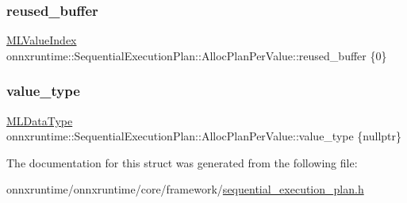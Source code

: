 \subsubsection{\texorpdfstring{reused\+\_\+buffer}{reused\_buffer}}
{\footnotesize\ttfamily \mbox{\hyperlink{namespaceonnxruntime_ab37a9454e2bb44bd7f75a95158097c8a}{M\+L\+Value\+Index}} onnxruntime\+::\+Sequential\+Execution\+Plan\+::\+Alloc\+Plan\+Per\+Value\+::reused\+\_\+buffer \{0\}}

\mbox{\label{structonnxruntime_1_1SequentialExecutionPlan_1_1AllocPlanPerValue_a39a898ec72a22825907bddad7ed83a6c}} 
\subsubsection{\texorpdfstring{value\+\_\+type}{value\_type}}
{\footnotesize\ttfamily \mbox{\hyperlink{namespaceonnxruntime_ad77d0a6e838ec7da5dc35fed5ee66b49}{M\+L\+Data\+Type}} onnxruntime\+::\+Sequential\+Execution\+Plan\+::\+Alloc\+Plan\+Per\+Value\+::value\+\_\+type \{nullptr\}}



The documentation for this struct was generated from the following file\+:\begin{DoxyCompactItemize}
\item 
onnxruntime/onnxruntime/core/framework/\mbox{\hyperlink{sequential__execution__plan_8h}{sequential\+\_\+execution\+\_\+plan.\+h}}\end{DoxyCompactItemize}
